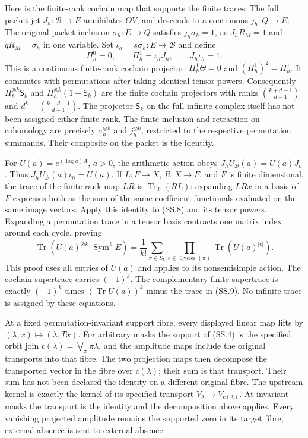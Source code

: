 Here is the finite-rank cochain map that supports the finite traces.
The full packet jet \(J_h:\mathscr B\to E\) annihilates
\(\Theta V\), and descends to a continuous
\(j_h:Q\to E\).  The original packet inclusion
\(\sigma_h:E\to Q\) satisfies \(j_h\sigma_h=1\), as
\(J_hR_M=1\) and \(qR_M=\sigma_h\) in one variable.
Set \(\iota_h=s\sigma_h:E\to\mathscr B\) and define
\[
 \Pi_h^0=0,\qquad \Pi_h^1=\iota_hJ_h,
 \qquad J_h\iota_h=1.                                \tag{SS.8}
\]
This is a continuous finite-rank cochain projector:
\(\Pi_h^1\Theta=0\) and \((\Pi_h^1)^2=\Pi_h^1\).
It commutes with permutations after taking identical tensor powers.
Consequently \(\Pi_h^{\otimes k}\mathsf S_k\) and
\(\Pi_h^{\otimes k}(1-\mathsf S_k)\) are the finite
cochain projectors with ranks \(\binom{k+d-1}{d-1}\) and
\(d^k-\binom{k+d-1}{d-1}\).  The projector
\(\mathsf S_k\) on the full infinite complex itself has not
been assigned either finite rank.  The finite inclusion and retraction
on cohomology are precisely \(\sigma_h^{\otimes k}\) and
\(j_h^{\otimes k}\), restricted to the respective permutation
summands.  Their composite on the packet is the identity.

For \(U(a)=e^{(\log a)A}\), \(a>0\), the arithmetic action
obeys \(J_hU_{\mathscr B}(a)=U(a)J_h\).  Thus
\(J_hU_{\mathscr B}(a)\iota_h=U(a)\).  If
\(L:F\to X\), \(R:X\to F\), and \(F\) is finite
dimensional, the trace of the finite-rank map \(LR\) is
\(\operatorname{Tr}_F(RL)\): expanding \(LRx\) in a
basis of \(F\) expresses both as the sum of the same coefficient
functionals evaluated on the same image vectors.  Apply this identity
to (SS.8) and its tensor powers.  Expanding a permutation trace in a
tensor basis contracts one matrix index around each cycle, proving
\[
 \operatorname{Tr}(U(a)^{\otimes k}|\operatorname{Sym}^k E)
 =\frac1{k!}\sum_{\pi\in S_k}
       \prod_{c\in\operatorname{Cycles}(\pi)}
                    \operatorname{Tr}(U(a)^{|c|}).       \tag{SS.9}
\]
This proof uses all entries of \(U(a)\) and applies to its
nonsemisimple action.  The cochain supertrace carries \((-1)^k\).
The complementary finite supertrace is exactly \((-1)^k\)
times \((\operatorname{Tr}U(a))^k\) minus the trace in
(SS.9).  No infinite trace is assigned by these equations.

At a fixed permutation-invariant support fibre, every displayed
linear map lifts by \((\lambda,x)\mapsto(\lambda,Tx)\).
For arbitrary masks the support of (SS.4) is the specified orbit join
\(c(\lambda)=\bigvee_\pi\pi\lambda\), and the amplitude
maps include the original transports into that fibre.  The two
projection maps then decompose the transported vector in the fibre
over \(c(\lambda)\); their sum is that transport.  Their sum
has not been declared the identity on a different original fibre.
The upstream kernel is exactly the kernel of its specified transport
\(V_\lambda\to V_{c(\lambda)}\).  At invariant masks the
transport is the identity and the decomposition above applies.
Every vanishing projected amplitude remains the supported zero in
its target fibre; external absence is sent to external absence.

